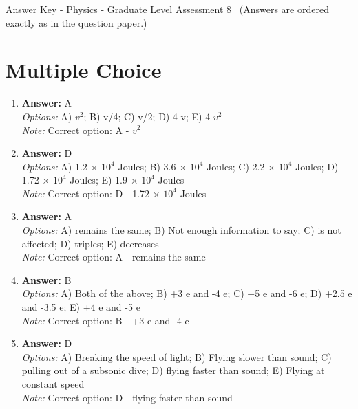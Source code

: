 \documentclass[12pt]{article}
\begin{document}
\begin{center}
Answer Key - Physics - Graduate Level Assessment 8 \
\small (Answers are ordered exactly as in the question paper.)
\end{center}

\section*{Multiple Choice}
\begin{enumerate}[label=\arabic*.]
\item \textbf{Answer:} A
\\ \textit{Options:} A) $v^2$; B) v/4; C) v/2; D) 4 v; E) 4 $v^2$
\\ \textit{Note:} Correct option: A - $v^2$
\item \textbf{Answer:} D
\\ \textit{Options:} A) 1.2 \ensuremath{\times} $10^4$ Joules; B) 3.6 \ensuremath{\times} $10^4$ Joules; C) 2.2 \ensuremath{\times} $10^4$ Joules; D) 1.72 \ensuremath{\times} $10^4$ Joules; E) 1.9 \ensuremath{\times} $10^4$ Joules
\\ \textit{Note:} Correct option: D - 1.72 \ensuremath{\times} $10^4$ Joules
\item \textbf{Answer:} A
\\ \textit{Options:} A) remains the same; B) Not enough information to say; C) is not affected; D) triples; E) decreases
\\ \textit{Note:} Correct option: A - remains the same
\item \textbf{Answer:} B
\\ \textit{Options:} A) Both of the above; B) +3 e and -4 e; C) +5 e and -6 e; D) +2.5 e and -3.5 e; E) +4 e and -5 e
\\ \textit{Note:} Correct option: B - +3 e and -4 e
\item \textbf{Answer:} D
\\ \textit{Options:} A) Breaking the speed of light; B) Flying slower than sound; C) pulling out of a subsonic dive; D) flying faster than sound; E) Flying at constant speed
\\ \textit{Note:} Correct option: D - flying faster than sound
\end{enumerate}
\end{document}
